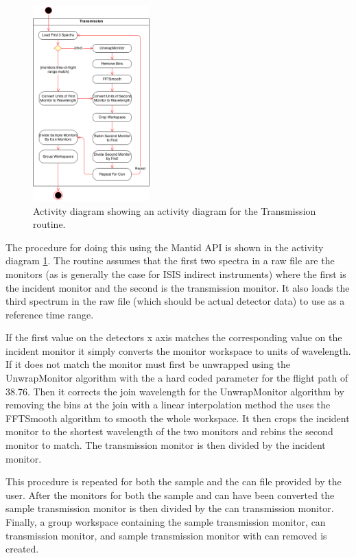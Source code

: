 \documentclass[paper=a4, fontsize=11pt]{scrartcl}	%
\numberwithin{equation}{section}															%
\numberwithin{figure}{section}																%
\numberwithin{table}{section}																%
\begin{document}
\begin{figure}[H]
\centering
\includegraphics[width=0.4\textwidth]{img/uml/activity_diagrams/Transmission_activity.png}
\caption{Activity diagram showing an activity diagram for the Transmission routine.}
\label{fig:c2e-transmission-activity-diagram}
\end{figure}

The procedure for doing this using the Mantid API is shown in the activity diagram \ref{fig:c2e-transmission-activity-diagram}. The routine assumes that the first two spectra in a raw file are the monitors (as is generally the case for ISIS indirect instruments) where the first is the incident monitor and the second is the transmission monitor. It also loads the third spectrum in the raw file (which should be actual detector data) to use as a reference time range. 

If the first value on the detectors x axis matches the corresponding value on the incident monitor it simply converts the monitor workspace to units of wavelength. If it does not match the monitor must first be unwrapped using the UnwrapMonitor algorithm with the a hard coded parameter for the flight path of 38.76. Then it corrects the join wavelength for the UnwrapMonitor algorithm by removing the bins at the join with a linear interpolation method the uses the FFTSmooth algorithm to smooth the whole workspace. It then crops the incident monitor to the shortest wavelength of the two monitors and rebins the second monitor to match. The transmission monitor is then divided by the incident monitor.

This procedure is repeated for both the sample and the can file provided by the user. After the monitors for both the sample and can have been converted the sample transmission monitor is then divided by the can transmission monitor. Finally, a group workspace containing the sample transmission monitor, can transmission monitor, and sample transmission monitor with can removed is created.
\end{document}
